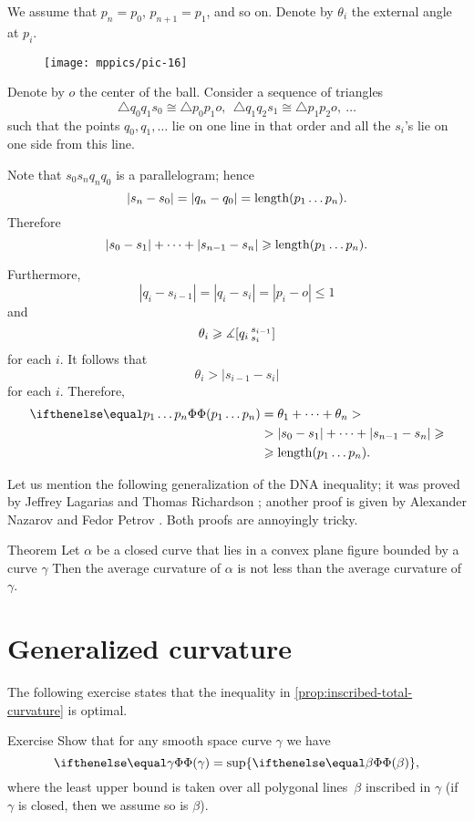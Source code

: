 We assume that $p_n=p_0$, $p_{n+1}=p_1$, and so on.
Denote by $\theta_i$ the external angle at $p_i$.

\begin{figure}[ht!]
\vskip-0mm
\centering
\texttt{[image: mppics/pic-16]}
\vskip0mm
\end{figure}

Denote by $o$ the center of the ball.
Consider a sequence of triangles 
\[\triangle q_0q_1s_0\cong \triangle p_0p_1o,\ \ \triangle q_1q_2s_1\cong \triangle p_1p_2o,\ \dots\]
such that the points $q_0,q_1,\dots$ lie on one line in that order and all the $s_i$'s lie on one side from this line.

Note that $s_0s_nq_nq_0$ is a parallelogram; hence
\[|s_n-s_0|=|q_n-q_0|=\mathop{\rm length}\nolimits (p_1\dots p_n).\]
Therefore 
\[|s_0-s_1|+\dots+|s_{n-1}-s_n|\geqslant \mathop{\rm length}\nolimits (p_1\dots p_n).\]

Furthermore,
\[|q_i-s_{i-1}|=|q_i-s_i|=|p_i-o|\le 1\]
and
\[\theta_i\geqslant\measuredangle [q_i\,{}^{s_{i-1}}_{s_i}]\]
for each $i$.
It follows that
\[\theta_i>|s_{i-1}-s_i|\]
for each $i$.
Therefore,
\begin{align*}
\tc {p_1\dots p_n}
&=\theta_1+\dots+\theta_n>
\\
&> |s_{0}-s_1|+\dots +|s_{n-1}-s_n|\ge 
\\
&\ge\length (p_1\dots p_n).
\end{align*}
\qedsf

Let us mention the following  generalization of the DNA inequality;
it was proved by Jeffrey Lagarias and Thomas Richardson \cite{lagarias-richardso}; another proof is given by Alexander Nazarov and Fedor Petrov \cite{nazarov-petrov}.
Both proofs are annoyingly tricky.

\begin{thm}{Theorem}
Let $\alpha$ be a closed curve that lies in a convex plane figure bounded by a curve $\gamma$
Then the average curvature of $\alpha$ is not less than the average curvature of $\gamma$.

\end{thm}

\section{Generalized curvature}

The following exercise states that the inequality in \ref{prop:inscribed-total-curvature} is optimal.

\begin{thm}{Exercise}\label{ex:total-curvature=}
Show that for any smooth space curve $\gamma$ we have 
\[\tc\gamma=\sup\{\tc\beta\},\]
where the least upper bound is taken over all polygonal lines~$\beta$ inscribed in $\gamma$
(if $\gamma$ is closed, then we assume so is $\beta$).
\end{thm}

